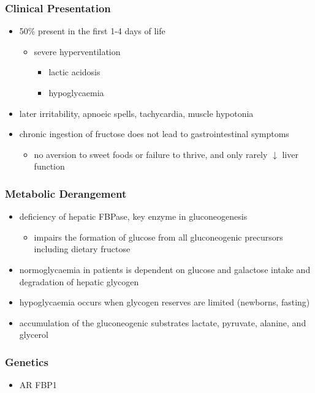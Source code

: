 \documentclass{scrartcl}
\begin{document}
\subsubsection{Clinical Presentation}
\label{sec:org56bb19c}
\begin{itemize}
\item 50\% present in the first 1-4 days of life
\begin{itemize}
\item severe hyperventilation
\begin{itemize}
\item lactic acidosis
\item hypoglycaemia
\end{itemize}
\end{itemize}
\item later irritability, apnoeic spells, tachycardia, muscle hypotonia
\item chronic ingestion of fructose does not lead to gastrointestinal symptoms
\begin{itemize}
\item no aversion to sweet foods or failure to thrive, and only rarely \(\downarrow\) liver function
\end{itemize}
\end{itemize}

\subsubsection{Metabolic Derangement}
\label{sec:orgeae8836}
\begin{itemize}
\item deficiency of hepatic FBPase, key enzyme in gluconeogenesis
\begin{itemize}
\item impairs the formation of glucose from all gluconeogenic precursors including dietary fructose
\end{itemize}
\item normoglycaemia in patients is dependent on glucose and galactose
intake and degradation of hepatic glycogen
\item hypoglycaemia occurs when glycogen reserves are limited (newborns, fasting)
\item accumulation of the gluconeogenic substrates lactate, pyruvate, alanine, and glycerol
\end{itemize}
\subsubsection{Genetics}
\label{sec:org5cc7cac}
\begin{itemize}
\item AR FBP1
\end{itemize}
\end{document}
